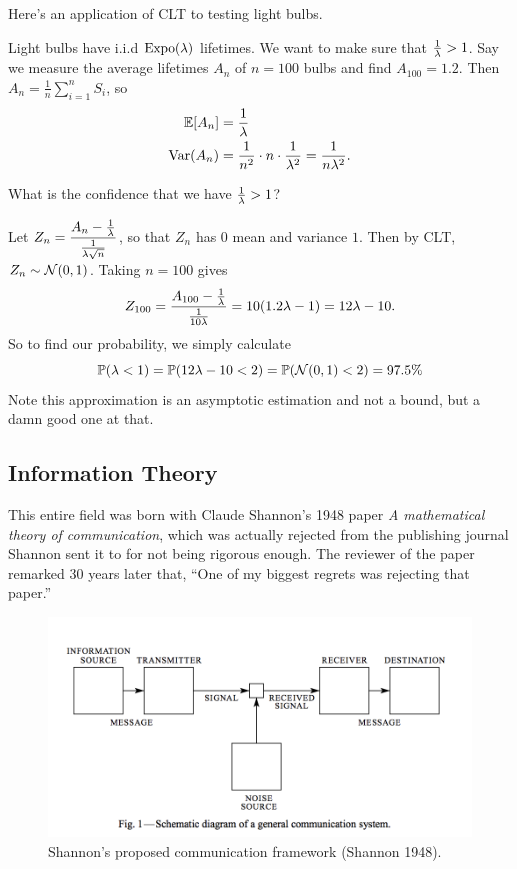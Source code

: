\documentclass[11 pt]{scrartcl}
\begin{document}
Here's an application of CLT to testing light bulbs. 
\begin{example}
    Light bulbs have i.i.d $\text{Expo}(\lambda)$ lifetimes. We want to make sure that $\frac{1}{\lambda} > 1$. Say we measure the average lifetimes $A_n$ of $n = 100$ bulbs and find $A_{100} = 1.2$. Then $A_n = \frac{1}{n}\sum_{i=1}^n S_i$, so 
    \begin{align*}
        \mathbb E[A_n] &= \frac{1}{\lambda} \\ 
        \text{Var}(A_n) &= \frac{1}{n^2}\cdot n \cdot \frac{1}{\lambda^2} = \frac{1}{n\lambda^2}. 
    \end{align*}
    \begin{question}
        What is the confidence that we have $\frac{1}{\lambda} > 1$? 
    \end{question}
    Let $Z_n = \dfrac{A_n - \frac{1}{\lambda}}{\frac{1}{\lambda\sqrt{n}}}$, so that $Z_n$ has $0$ mean and variance $1$. Then by CLT, $Z_n\sim \mathcal{N}(0,1)$. Taking $n = 100$ gives 
    \[ Z_{100}  = \dfrac{A_{100} - \frac{1}{\lambda}}{\frac{1}{10\lambda}} = 10(1.2\lambda -1) = 12\lambda - 10.\] 
    So to find our probability, we simply calculate 
    \[ \mathbb P(\lambda < 1) = \mathbb P(12\lambda - 10 < 2) = \mathbb P(\mathcal{N}(0,1) < 2) = 97.5\%\] 
    Note this approximation is an asymptotic estimation and not a bound, but a damn good one at that. 
\end{example}

\subsection{Information Theory}
This entire field was born with Claude Shannon's 1948 paper \emph{A mathematical theory of communication}, which was actually rejected from the publishing journal Shannon sent it to for not being rigorous enough. The reviewer of the paper remarked 30 years later that, ``One of my biggest regrets was rejecting that paper.'' 


\begin{figure}[!ht]
    \centering
    \includegraphics[scale=0.8]{shannon_paper_fig.png}
\caption{Shannon's proposed communication framework (Shannon 1948).}
\end{figure}
\end{document}
